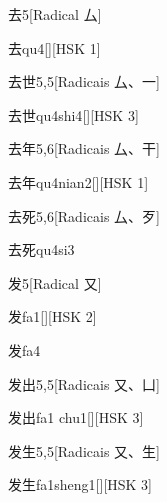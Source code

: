 \begin{entry}{去}{5}[Radical ⼛]
  \begin{phonetics}{去}{qu4}[][HSK 1]
  \end{phonetics}
\end{entry}

\begin{entry}{去世}{5,5}[Radicais ⼛、⼀]
  \begin{phonetics}{去世}{qu4shi4}[][HSK 3]
  \end{phonetics}
\end{entry}

\begin{entry}{去年}{5,6}[Radicais ⼛、⼲]
  \begin{phonetics}{去年}{qu4nian2}[][HSK 1]
  \end{phonetics}
\end{entry}

\begin{entry}{去死}{5,6}[Radicais ⼛、⽍]
  \begin{phonetics}{去死}{qu4si3}
  \end{phonetics}
\end{entry}

\begin{entry}{发}{5}[Radical ⼜]
  \begin{phonetics}{发}{fa1}[][HSK 2]
  \end{phonetics}
  \begin{phonetics}{发}{fa4}
  \end{phonetics}
\end{entry}

\begin{entry}{发出}{5,5}[Radicais ⼜、⼐]
  \begin{phonetics}{发出}{fa1 chu1}[][HSK 3]
  \end{phonetics}
\end{entry}

\begin{entry}{发生}{5,5}[Radicais ⼜、⽣]
  \begin{phonetics}{发生}{fa1sheng1}[][HSK 3]
  \end{phonetics}
\end{entry}

